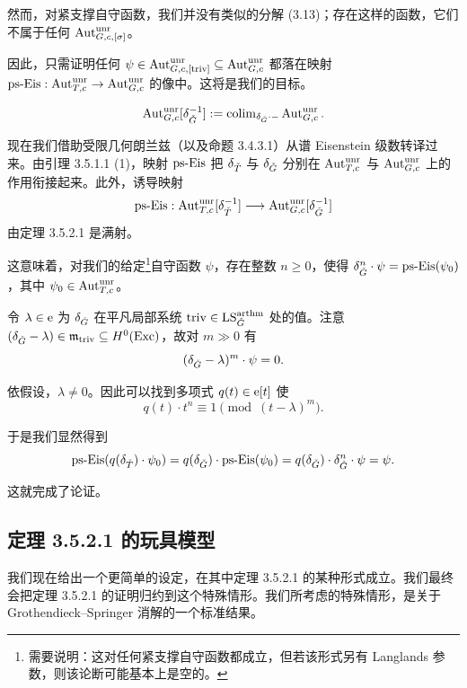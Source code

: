 然而，对紧支撑自守函数，我们并没有类似的分解 (3.13)；存在这样的函数，它们不属于任何 $\operatorname{Aut}^{\mathrm{unr}}_{G,c,[\sigma]}$。


因此，只需证明任何 $\psi\in\operatorname{Aut}^{\mathrm{unr}}_{G,c,[\mathrm{triv}]}\subseteq\operatorname{Aut}^{\mathrm{unr}}_{G,c}$ 都落在映射 $\mathrm{ps}\text{-}\mathrm{Eis}:\operatorname{Aut}^{\mathrm{unr}}_{T,c}\to\operatorname{Aut}^{\mathrm{unr}}_{G,c}$ 的像中。这将是我们的目标。

\[
  \operatorname{Aut}^{\mathrm{unr}}_{G,c}[\delta_{\check{G}}^{-1}] := \operatorname{colim}_{\delta_{\check{G}}\cdot-}\operatorname{Aut}^{\mathrm{unr}}_{G,c}.
\]

现在我们借助受限几何朗兰兹（以及命题 3.4.3.1）从谱 Eisenstein 级数转译过来。由引理 3.5.1.1 (1)，映射 $\mathrm{ps}\text{-}\mathrm{Eis}$ 把 $\delta_{\check{T}}$ 与 $\delta_{\check{G}}$ 分别在 $\operatorname{Aut}^{\mathrm{unr}}_{T,c}$ 与 $\operatorname{Aut}^{\mathrm{unr}}_{G,c}$ 上的作用衔接起来。此外，诱导映射
\[
  \mathrm{ps}\text{-}\mathrm{Eis} : \operatorname{Aut}^{\mathrm{unr}}_{T,c}[\delta_{\check{T}}^{-1}]
  \longrightarrow \operatorname{Aut}^{\mathrm{unr}}_{G,c}[\delta_{\check{G}}^{-1}]
\]
由定理 3.5.2.1 是满射。

这意味着，对我们的给定\footnote{需要说明：这对任何紧支撑自守函数都成立，但若该形式另有 Langlands 参数，则该论断可能基本上是空的。}自守函数 $\psi$，存在整数 $n\ge 0$，使得 $\delta_{\check{G}}^n\cdot\psi=\mathrm{ps}\text{-}\mathrm{Eis}(\psi_0)$，其中 $\psi_0\in\operatorname{Aut}^{\mathrm{unr}}_{T,c}$。

令 $\lambda\in\mathrm{e}$ 为 $\delta_{\check{G}}$ 在平凡局部系统 $\mathrm{triv}\in\mathrm{LS}^{\mathrm{arthm}}_{\check{G}}$ 处的值。注意 $(\delta_{\check{G}}-\lambda)\in\mathfrak m_{\mathrm{triv}}\subseteq H^0(\mathrm{Exc})$，故对 $m\gg 0$ 有
\[
  (\delta_{\check{G}}-\lambda)^m\cdot\psi=0.
\]

依假设，$\lambda\ne 0$。因此可以找到多项式 $q(t)\in\mathrm{e}[t]$ 使
\[
  q(t)\cdot t^n \equiv 1 \pmod{(t-\lambda)^m}.
\]

于是我们显然得到
\[
  \mathrm{ps}\text{-}\mathrm{Eis}(q(\delta_{\check{T}})\cdot\psi_0)
  = q(\delta_{\check{G}})\cdot\mathrm{ps}\text{-}\mathrm{Eis}(\psi_0)
  = q(\delta_{\check{G}})\cdot\delta_{\check{G}}^n\cdot\psi
  = \psi.
\]

这就完成了论证。

\subsection{定理 3.5.2.1 的玩具模型}

我们现在给出一个更简单的设定，在其中定理 3.5.2.1 的某种形式成立。我们最终会把定理 3.5.2.1 的证明归约到这个特殊情形。我们所考虑的特殊情形，是关于 Grothendieck--Springer 消解的一个标准结果。

